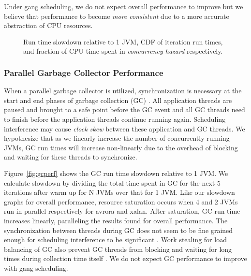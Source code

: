 \documentclass{sig-alternate}
\begin{document}
Under gang scheduling, we do not expect overall performance to improve but we believe that performance to become \textit{more consistent} due to a more accurate abstraction of CPU resources.

\begin{figure*}
\centering
{}
\caption{Run time slowdown relative to 1 JVM, CDF of iteration run times, and fraction of CPU time spent in \textit{concurrency hazard} respectively.}
\label{fig:overallperf}
\end{figure*}

\subsubsection{Parallel Garbage Collector Performance} \label{sssec:overallperfresults}
When a parallel garbage collector is utilized, synchronization is necessary at the start and end phases of garbage collection (GC) \cite{hotspot:whitepaper}. All application threads are paused and brought to a safe point before the GC event and all GC threads need to finish before the application threads continue running again. Scheduling interference may cause \textit{clock skew} between these application and GC threads. We hypothesize that as we linearly increase the number of concurrently running JVMs, GC run times will increase non-linearly due to the overhead of blocking and waiting for these threads to synchronize.

Figure~\ref{fig:gcperf} shows the GC run time slowdown relative to 1 JVM. We calculate slowdown by dividing the total time spent in GC for the next 5 iterations after warm up for N JVMs over that for 1 JVM. Like our slowdown graphs for overall performance, resource saturation occurs when 4 and 2 JVMs run in parallel respectively for avrora and xalan. After saturation, GC run time increases linearly, paralleling the results found for overall performance. The synchronization between threads during GC does not seem to be fine grained enough for scheduling interference to be significant \cite{feitelson1992gang}. Work stealing for load balancing of GC also prevent GC threads from blocking and waiting for long times during collection time itself \cite{stoptheworldgc}. We do not expect GC performance to improve with gang scheduling.
\end{document}
